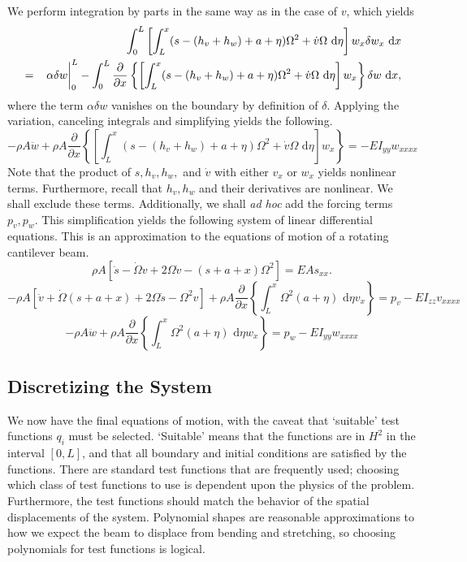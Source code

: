 We perform integration by parts in the same way as in the case of $v$, which yields
\begin{eqnarray}
& &\int_0^L \left[\int_L^x(s-(h_v+h_w)+a+\eta)\Omega^2+\dot v\Omega\text{ d}\eta\right] w_{x}\delta w_x\text{ d}x \\
&=& \left.\vphantom{\frac{0}{0}}\alpha\delta w\right|_0^L-\int_0^L\frac{\partial }{\partial x}\left\lbrace\left[\int_L^x( s-(h_v+h_w)+a+\eta)\Omega^2+\dot v\Omega\text{ d}\eta\right] w_{x}\right\rbrace\delta w\text{ d}x,\nonumber
\end{eqnarray}
where the term $\alpha\delta w$ vanishes on the boundary by definition of $\delta$.
Applying the variation, canceling integrals and simplifying yields the following.
\begin{equation}
-\rho A \ddot w+\rho A \frac{\partial }{\partial x}\left\lbrace\left[\int_L^x( s-(h_v+h_w)+a+\eta)\Omega^2+\dot v\Omega\text{ d}\eta\right] w_{x}\right\rbrace = -EI_{yy} w_{xxxx}
\end{equation}
Note that the product of $s,h_v,h_w,$ and $\dot v$ with either $v_{x}$ or $w_{x}$ yields nonlinear terms. Furthermore, recall that $h_v,h_w$ and their derivatives are nonlinear. We shall exclude these terms. Additionally, we shall \emph{ad hoc} add the forcing terms $p_v,p_w$. This simplification yields the following system of linear differential equations. This is an approximation to the equations of motion of a rotating cantilever beam.
\begin{equation}
\rho A \left[\ddot s-\dot \Omega v+2\Omega\dot v-(s+a+x)\Omega^2\right] = EAs_{xx}.
\label{eq:EL_s_final}
\end{equation}
\begin{equation}
-\rho A [\ddot v + \dot \Omega (s+a+x)+2\Omega\dot s-\Omega^2v]+\rho A\frac{\partial}{\partial x}\left\lbrace \int_L^x\Omega^2(a+\eta)\text{ d}\eta v_{x}\right\rbrace = p_v-EI_{zz}v_{xxxx} 
\label{eq:EL_v_final}
\end{equation}
\begin{equation}
-\rho A \ddot w+\rho A \frac{\partial}{\partial x}\left\lbrace\int_L^x\Omega^2(a+\eta)\text{ d}\eta w_{x}\right\rbrace = p_w-EI_{yy} w_{xxxx}
\label{eq:EL_w_final}
\end{equation}

\subsection{Discretizing the System}
\label{subsec:discretizing}
We now have the final equations of motion, with the caveat that `suitable' test functions $q_i$ must be selected. `Suitable' means that the functions are in $H^2$ in the interval $[0,L]$, and that all boundary and initial conditions are satisfied by the functions. There are standard test functions that are frequently used; choosing which class of test functions to use is dependent upon the physics of the problem. Furthermore, the test functions should match the behavior of the spatial displacements of the system. Polynomial shapes are reasonable approximations to how we expect the beam to displace from bending and stretching, so choosing polynomials for test functions is logical.

